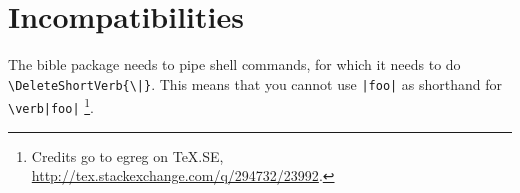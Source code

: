 \documentclass[a4paper]{ltxguide}
\begin{document}
\section{Incompatibilities}
The \textsf{bible} package needs to pipe shell commands,
	for which it needs to do \verb$\DeleteShortVerb{\|}$.
This means that you cannot use \verb$|foo|$ as shorthand for \verb$\verb|foo|$%
	\footnote{Credits go to egreg on TeX.SE, \url{http://tex.stackexchange.com/q/294732/23992}.}.
\end{document}

